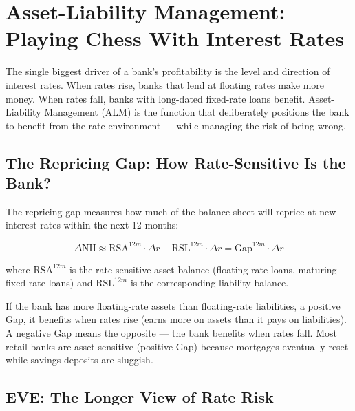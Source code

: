 \documentclass[12pt,a4paper]{article}
\begin{document}
\section{Asset-Liability Management: Playing Chess With Interest Rates}

The single biggest driver of a bank's profitability is the level and direction
of interest rates.  When rates rise, banks that lend at floating rates make
more money.  When rates fall, banks with long-dated fixed-rate loans benefit.
Asset-Liability Management (ALM) is the function that deliberately positions
the bank to benefit from the rate environment --- while managing the risk of
being wrong.

\subsection{The Repricing Gap: How Rate-Sensitive Is the Bank?}

The repricing gap measures how much of the balance sheet will reprice at new
interest rates within the next 12 months:

\begin{equation}
  \Delta\text{NII} \approx \text{RSA}^{12m} \cdot \Delta r - \text{RSL}^{12m} \cdot \Delta r
  = \text{Gap}^{12m} \cdot \Delta r
  \label{eq:gap}
\end{equation}

where $\text{RSA}^{12m}$ is the rate-sensitive asset balance (floating-rate
loans, maturing fixed-rate loans) and $\text{RSL}^{12m}$ is the corresponding
liability balance.

\begin{mdframed}[style=plainenglish]
If the bank has more floating-rate assets than floating-rate liabilities,
a positive Gap, it benefits when rates rise (earns more on assets than it
pays on liabilities).  A negative Gap means the opposite --- the bank
benefits when rates fall.  Most retail banks are asset-sensitive (positive
Gap) because mortgages eventually reset while savings deposits are sluggish.
\end{mdframed}

\subsection{EVE: The Longer View of Rate Risk}
\end{document}
